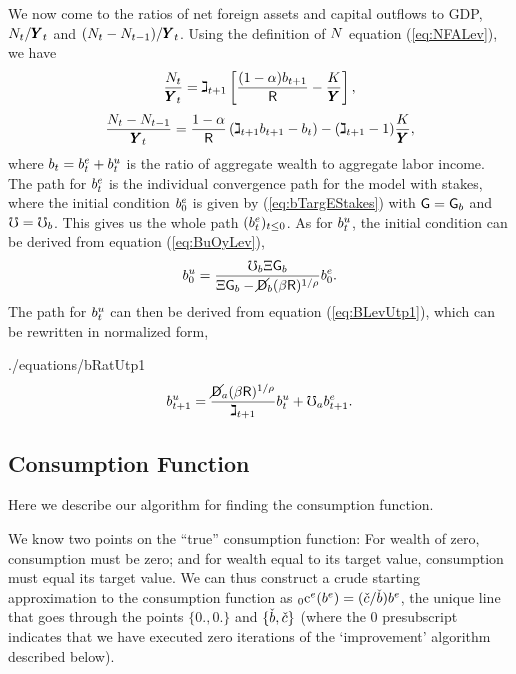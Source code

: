 \documentclass[titlepage,abstract,letterpaper]{econtex}
\renewcommand{\GDPLev}{\ensuremath{\pmb{Y}}}
\begin{document}
We now come to the ratios of net foreign assets and capital outflows to GDP, $\NFALev_t/\GDPLev_t$ and $(\NFALev_t -\NFALev_{t-1})/\GDPLev_t$. Using the definition of $N$ equation (\ref{eq:NFALev}), we have
\begin{equation*}
\frac{\NFALev_t}{\GDPLev_t}=\GDPGro_{t+1} \left[ \frac{(1-\kapShare) \bRat_{t+1}}{\Rfree} -\frac{\KLev}{\GDPLev} \right],
\end{equation*}
\begin{equation*}
\frac{\NFALev_t -\NFALev_{t-1}}{\GDPLev_t}=\frac{1-\kapShare}{\Rfree} \left( \GDPGro_{t+1} \bRat_{t+1} -\bRat_t \right) -(\GDPGro_{t+1}-1)\frac{\KLev}{\GDPLev},
\end{equation*}
where $b_t=b^{e}_t+b^{u}_t$ is the ratio of aggregate wealth to aggregate labor income. The path for $b^{e}_t$ is the individual convergence path for the model with stakes, where the initial condition $b^{e}_0$ is given by (\ref{eq:bTargEStakes}) with $\mathsf{G} = \mathsf{G}_b$ and $\mho = \mho_b$. This gives us the whole path $(b^{e}_t)_{t \leq 0}$.
As for $b^{u}_t$, the initial condition can be derived from equation (\ref{eq:BuOyLev}),
\begin{equation*}
b^{u}_0= \frac{\mho_b \Xi \mathsf{G}_b}{\Xi \mathsf{G}_b -\cancel{\mathsf{D}}_b(\beta \mathsf{R} )^{1/\rho}} b^{e}_0.
\end{equation*}
The path for $b^{u}_t$ can then be derived from equation
(\ref{eq:BLevUtp1}), which can be rewritten in normalized form,
\begin{verbatimwrite}{./equations/bRatUtp1}
\begin{equation*}
b^{u}_{t+1}=\frac{\cancel{\mathsf{D}}_a(\beta \mathsf{R})^{1/\rho}}{\gimel_{t+1}} b^{u}_t + \mho_a b^{e}_{t+1}.
\end{equation*}
\end{verbatimwrite}


\subsection{Consumption Function}

Here we describe our algorithm for finding the consumption
function.

We know two points on the ``true'' consumption function: For wealth of
zero, consumption must be zero; and for wealth equal to its target value,
consumption must equal its target value.  We can thus construct a crude starting approximation
to the consumption function as $_0\mathrm{c}^{e}(b^{e}) = (\check{c}/\check{b})b^{e}$,
the unique line that goes through the points $\{0.,0.\}$ and $\{\check{b},\check{c}\}$ (where
the 0 presubscript indicates that we have executed zero iterations of the `improvement' algorithm
described below).
\end{document}
